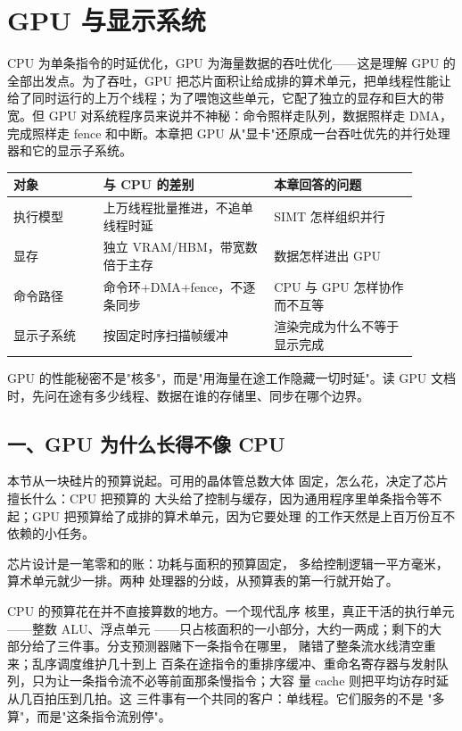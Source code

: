\chapter{GPU 与显示系统}

CPU 为单条指令的时延优化，GPU 为海量数据的吞吐优化——这是理解 GPU 的全部出发点。为了吞吐，GPU 把芯片面积让给成排的算术单元，把单线程性能让给了同时运行的上万个线程；为了喂饱这些单元，它配了独立的显存和巨大的带宽。但 GPU 对系统程序员来说并不神秘：命令照样走队列，数据照样走 DMA，完成照样走 fence 和中断。本章把 GPU 从"显卡"还原成一台吞吐优先的并行处理器和它的显示子系统。

\begin{longtable}{L{0.2\linewidth}L{0.38\linewidth}L{0.32\linewidth}}
\toprule
对象 & 与 CPU 的差别 & 本章回答的问题 \\
\midrule
执行模型 & 上万线程批量推进，不追单线程时延 & SIMT 怎样组织并行 \\
显存 & 独立 VRAM/HBM，带宽数倍于主存 & 数据怎样进出 GPU \\
命令路径 & 命令环+DMA+fence，不逐条同步 & CPU 与 GPU 怎样协作而不互等 \\
显示子系统 & 按固定时序扫描帧缓冲 & 渲染完成为什么不等于显示完成 \\
\bottomrule
\end{longtable}

\begin{keyidea}
GPU 的性能秘密不是"核多"，而是"用海量在途工作隐藏一切时延"。读 GPU 文档时，先问在途有多少线程、数据在谁的存储里、同步在哪个边界。
\end{keyidea}

\section{一、GPU 为什么长得不像 CPU}

本节从一块硅片的预算说起。可用的晶体管总数大体
固定，怎么花，决定了芯片擅长什么：CPU 把预算的
大头给了控制与缓存，因为通用程序里单条指令等不
起；GPU 把预算给了成排的算术单元，因为它要处理
的工作天然是上百万份互不依赖的小任务。

芯片设计是一笔零和的账：功耗与面积的预算固定，
多给控制逻辑一平方毫米，算术单元就少一排。两种
处理器的分歧，从预算表的第一行就开始了。

CPU 的预算花在并不直接算数的地方。一个现代乱序
核里，真正干活的执行单元——整数 ALU、浮点单元
——只占核面积的一小部分，大约一两成；剩下的大
部分给了三件事。分支预测器赌下一条指令在哪里，
赌错了整条流水线清空重来；乱序调度维护几十到上
百条在途指令的重排序缓冲、重命名寄存器与发射队
列，只为让一条指令流不必等前面那条慢指令；大容
量 cache 则把平均访存时延从几百拍压到几拍。这
三件事有一个共同的客户：单线程。它们服务的不是
"多算"，而是"这条指令流别停"。

